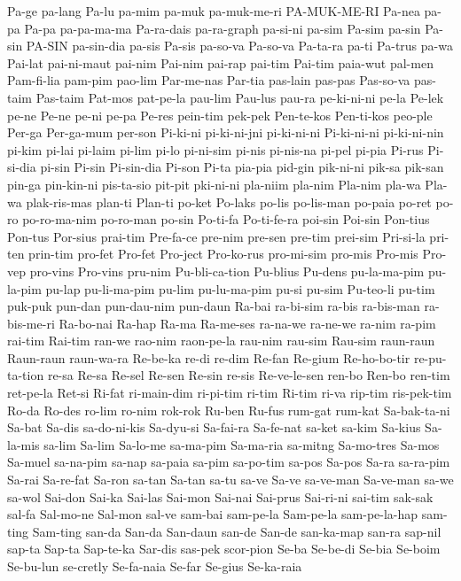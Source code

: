 {Pa-ge
pa-lang
Pa-lu
pa-mim
pa-muk
pa-muk-me-ri
PA-MUK-ME-RI
Pa-nea
pa-pa
Pa-pa
pa-pa-ma-ma
Pa-ra-dais
pa-ra-graph
pa-si-ni
pa-sim
Pa-sim
pa-sin
Pa-sin
PA-SIN
pa-sin-dia
pa-sis
Pa-sis
pa-so-va
Pa-so-va
Pa-ta-ra
pa-ti
Pa-trus
pa-wa
Pai-lat
pai-ni-maut
pai-nim
Pai-nim
pai-rap
pai-tim
Pai-tim
paia-wut
pal-men
Pam-fi-lia
pam-pim
pao-lim
Par-me-nas
Par-tia
pas-lain
pas-pas
Pas-so-va
pas-taim
Pas-taim
Pat-mos
pat-pe-la
pau-lim
Pau-lus
pau-ra
pe-ki-ni-ni
pe-la
Pe-lek
pe-ne
Pe-ne
pe-ni
pe-pa
Pe-res
pein-tim
pek-pek
Pen-te-kos
Pen-ti-kos
peo-ple
Per-ga
Per-ga-mum
per-son
Pi-ki-ni
pi-ki-ni-jni
pi-ki-ni-ni
Pi-ki-ni-ni
pi-ki-ni-nin
pi-kim
pi-lai
pi-laim
pi-lim
pi-lo
pi-ni-sim
pi-nis
pi-nis-na
pi-pel
pi-pia
Pi-rus
Pi-si-dia
pi-sin
Pi-sin
Pi-sin-dia
Pi-son
Pi-ta
pia-pia
pid-gin
pik-ni-ni
pik-sa
pik-san
pin-ga
pin-kin-ni
pis-ta-sio
pit-pit
pki-ni-ni
pla-niim
pla-nim
Pla-nim
pla-wa
Pla-wa
plak-ris-mas
plan-ti
Plan-ti
po-ket
Po-laks
po-lis
po-lis-man
po-paia
po-ret
po-ro
po-ro-ma-nim
po-ro-man
po-sin
Po-ti-fa
Po-ti-fe-ra
poi-sin
Poi-sin
Pon-tius
Pon-tus
Por-sius
prai-tim
Pre-fa-ce
pre-nim
pre-sen
pre-tim
prei-sim
Pri-si-la
pri-ten
prin-tim
pro-fet
Pro-fet
Pro-ject
Pro-ko-rus
pro-mi-sim
pro-mis
Pro-mis
Pro-vep
pro-vins
Pro-vins
pru-nim
Pu-bli-ca-tion
Pu-blius
Pu-dens
pu-la-ma-pim
pu-la-pim
pu-lap
pu-li-ma-pim
pu-lim
pu-lu-ma-pim
pu-si
pu-sim
Pu-teo-li
pu-tim
puk-puk
pun-dan
pun-dau-nim
pun-daun
Ra-bai
ra-bi-sim
ra-bis
ra-bis-man
ra-bis-me-ri
Ra-bo-nai
Ra-hap
Ra-ma
Ra-me-ses
ra-na-we
ra-ne-we
ra-nim
ra-pim
rai-tim
Rai-tim
ran-we
rao-nim
raon-pe-la
rau-nim
rau-sim
Rau-sim
raun-raun
Raun-raun
raun-wa-ra
Re-be-ka
re-di
re-dim
Re-fan
Re-gium
Re-ho-bo-tir
re-pu-ta-tion
re-sa
Re-sa
Re-sel
Re-sen
Re-sin
re-sis
Re-ve-le-sen
ren-bo
Ren-bo
ren-tim
ret-pe-la
Ret-si
Ri-fat
ri-main-dim
ri-pi-tim
ri-tim
Ri-tim
ri-va
rip-tim
ris-pek-tim
Ro-da
Ro-des
ro-lim
ro-nim
rok-rok
Ru-ben
Ru-fus
rum-gat
rum-kat
Sa-bak-ta-ni
Sa-bat
Sa-dis
sa-do-ni-kis
Sa-dyu-si
Sa-fai-ra
Sa-fe-nat
sa-ket
sa-kim
Sa-kius
Sa-la-mis
sa-lim
Sa-lim
Sa-lo-me
sa-ma-pim
Sa-ma-ria
sa-mitng
Sa-mo-tres
Sa-mos
Sa-muel
sa-na-pim
sa-nap
sa-paia
sa-pim
sa-po-tim
sa-pos
Sa-pos
Sa-ra
sa-ra-pim
Sa-rai
Sa-re-fat
Sa-ron
sa-tan
Sa-tan
sa-tu
sa-ve
Sa-ve
sa-ve-man
Sa-ve-man
sa-we
sa-wol
Sai-don
Sai-ka
Sai-las
Sai-mon
Sai-nai
Sai-prus
Sai-ri-ni
sai-tim
sak-sak
sal-fa
Sal-mo-ne
Sal-mon
sal-ve
sam-bai
sam-pe-la
Sam-pe-la
sam-pe-la-hap
sam-ting
Sam-ting
san-da
San-da
San-daun
san-de
San-de
san-ka-map
san-ra
sap-nil
sap-ta
Sap-ta
Sap-te-ka
Sar-dis
sas-pek
scor-pion
Se-ba
Se-be-di
Se-bia
Se-boim
Se-bu-lun
se-cretly
Se-fa-naia
Se-far
Se-gius
Se-ka-raia
}
